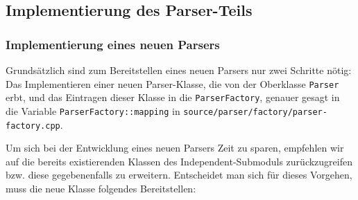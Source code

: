 \subsection{Implementierung des Parser-Teils}

\subsubsection{Implementierung eines neuen Parsers}

Grundsätzlich sind zum Bereitstellen eines neuen Parsers nur zwei Schritte
nötig: Das Implementieren einer neuen Parser-Klasse, die von der Oberklasse
\texttt{Parser} erbt, und das Eintragen dieser Klasse in die
\texttt{Parser\-Factory}, genauer gesagt in die Variable
\texttt{ParserFactory::\allowbreak{}mapping} in
\texttt{source/\allowbreak{}parser/\allowbreak{}factory/\allowbreak{}parser-factory.cpp}.

Um sich bei der Entwicklung eines neuen Parsers Zeit zu sparen, empfehlen wir
auf die bereits existierenden Klassen des Independent-Submoduls zurückzugreifen
bzw. diese gegebenenfalls zu erweitern. Entscheidet man sich für dieses
Vorgehen, muss die neue Klasse folgendes Bereitstellen:


